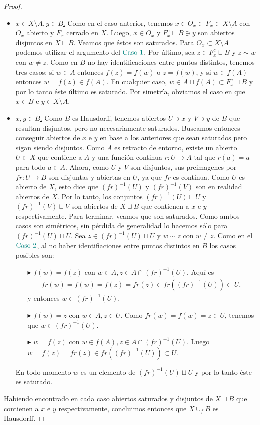\documentclass[11pt]{article}
\newcommand{\paint}[2]{\color{#1}{#2}}
\begin{document}
\begin{proof}
\begin{itemize}
\item \underline{\textbf{\paint{grey-light-blue}{\text{Caso $2$:}}} $x \in X \setminus A, y \in B$.} Como en el caso anterior, tenemos $x \in O_x \subset F_x \subset X \setminus A$ con $O_x$ abierto y $F_x$ cerrado en $X$. Luego, $x \in O_x$ y $F_x^c \sqcup B \ni y$ son abiertos disjuntos en $X \sqcup B$. Veamos que \'estos son saturados. Para $O_x \subset X \setminus A$ podemos utilizar el argumento del $\paint{grey-light-blue}{\text{Caso } 1}$. Por \'ultimo, sea $z \in F_x^c \sqcup B$ y $z \sim w$ con $w \neq z$. Como en $B$ no hay identificaciones entre puntos distintos, tenemos tres casos: si $w \in A$ entonces $f(z) = f(w)$ o $z = f(w)$, y si $w \in f(A)$ entonces $w = f(z) \in f(A)$. En cualquier caso, $w \in A \sqcup f(A) \subset F_x^c \sqcup B$ y por lo tanto \'este \'ultimo es saturado. Por simetr\'ia, obviamos el caso en que $x \in B$ e $y \in X \setminus A$.
\item \underline{\textbf{\paint{grey-light-blue}{\text{Caso $3$:}}} $x,y \in B$.} Como $B$ es Hausdorff, tenemos abiertos $U \ni x$ y $V \ni y$ de $B$ que resultan disjuntos, pero no necesariamente saturados. Buscamos entonces conseguir abiertos de $x$ e $y$ en base a los anteriores que sean saturados pero sigan siendo disjuntos. Como $A$ es retracto de entorno, existe un abierto $U \subset X$ que contiene a $A$ y una funci\'on continua $r : U \to A$ tal que $r(a) = a$ para todo $a \in A$. Ahora, como $U$ y $V$ son disjuntos, sus preimagenes por $fr : U \to B$ son disjuntas y abiertas en $U$, ya que $fr$ es continua. Como $U$ es abierto de $X$, esto dice que $(fr)^{-1}(U)$ y $(fr)^{-1}(V)$ son en realidad abiertos de $X$. Por lo tanto, los conjuntos $(fr)^{-1}(U) \sqcup U$ y $(fr)^{-1}(V) \sqcup V$ son abiertos de $X \sqcup B$ que contienen a $x$ e $y$ respectivamente. Para terminar, veamos que son saturados. Como ambos casos son sim\'etricos, sin p\'erdida de generalidad lo hacemos s\'olo para $(fr)^{-1}(U) \sqcup U$. Sea $z \in (fr)^{-1}(U) \sqcup U$ y $w \sim z$ con $w \neq z$. Como en el $\paint{grey-light-blue}{\text{Caso } 2}$, al no haber identifiaciones entre puntos distintos en $B$ los casos posibles son:
\begin{itemize}
\item[$\blacktriangleright$] $f(w) =f(z)$ con $w \in A, z \in A \cap (fr)^{-1}(U)$. Aqu\'i es
\begin{align*}
fr(w) = f(w) = f(z) = fr(z) \in fr((fr)^{-1}(U)) \subset U,
\end{align*}
y entonces $w \in (fr)^{-1}(U)$.
\item[$\blacktriangleright$] $f(w) = z$ con $w \in A, z \in U$. Como $fr(w) = f(w) = z \in U$, tenemos que $w \in (fr)^{-1}(U)$. 
\item[$\blacktriangleright$] $w = f(z)$ con $w \in f(A), z \in A \cap (fr)^{-1}(U)$. Luego $w = f(z) = fr(z) \in fr((fr)^{-1}(U)) \subset U$.
\end{itemize}
En todo momento $w$ es un elemento de $(fr)^{-1}(U) \sqcup U$ y por lo tanto \'este es saturado.
\end{itemize}
Habiendo encontrado en cada caso abiertos saturados y disjuntos de $X \sqcup B$ que contienen a $x$ e $y$ respectivamente, concluimos entonces que $X \cup_f B$ es Hausdorff. 
\end{proof}
\end{document}
